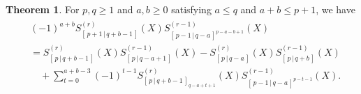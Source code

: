 \documentclass[12pt]{amsart}%
\theoremstyle{definition}
\newtheorem{theorem}{Theorem}[section]
\begin{document}
\begin{theorem}
\label{square general}
For $p,q\ge 1$ and $a,b\ge 0$ satisfying  $a\le q$ and $a+b\le p+1$,
we have 
\begin{align}
\label{for:9thRectangle general}
\begin{split}
&
(-1)^{a+b}S_{[\,p+1\,|\,q+b-1\,]}^{(r)}(X)
S_{[\,p-1\,|\,q-a\,]^{p-a-b+1}}^{(r-1)}(X)\\
&=S_{[\,p\,|\,q+b-1\,]}^{(r)}(X)
S_{[\,p\,|\,q-a+1\,]}^{(r-1)}(X)
-S_{[\,p\,|\,q-a\,]}^{(r)}(X)
S_{[\,p\,|\,q+b\,]}^{(r-1)}(X)\\
&\quad +\sum^{a+b-3}_{t=0}(-1)^{t-1}
S_{[\,p\,|\,q+b-1\,]_{q-a+t+1}}^{(r)}(X)
S_{[\,p-1\,|\,q-a\,]^{p-t-1}}^{(r-1)}(X).
\end{split}
\end{align}
\end{theorem}
\end{document}

